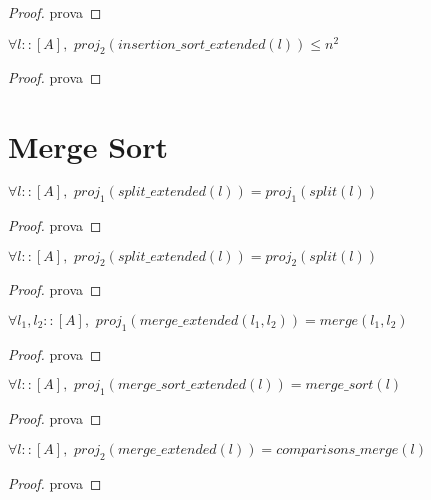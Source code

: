 \documentclass[12pt, oneside, a4paper,english,brazil]{abntex2}
\begin{document}
\begin{proof}
  prova
\end{proof}

\begin{teorema}
  $\forall l :: [A], \,\, proj_{2}(insertion\_sort\_extended(l)) \le n^{2}$
\end{teorema}

\begin{proof}
  prova
\end{proof}

\section{Merge Sort}

\begin{teorema}
  $\forall l :: [A], \,\, proj_1(split\_extended(l)) = proj_{1}(split(l))$
\end{teorema}

\begin{proof}
  prova
\end{proof}

\begin{teorema}
  $\forall l :: [A], \,\, proj_2(split\_extended(l)) = proj_{2}(split(l))$
\end{teorema}

\begin{proof}
  prova
\end{proof}

\begin{teorema}
  $\forall l_{1}, l_{2} :: [A], \,\, proj_1(merge\_extended(l_{1}, l_{2})) = merge(l_{1}, l_{2})$
\end{teorema}
\begin{proof}
  prova
\end{proof}

\begin{teorema}
  $\forall l :: [A], \,\, proj_{1}(merge\_sort\_extended(l)) = merge\_sort(l)$
\end{teorema}

\begin{proof}
  prova
\end{proof}

\begin{teorema}
  $\forall l :: [A], \,\, proj_{2}(merge\_extended(l)) = comparisons\_merge(l)$
\end{teorema}

\begin{proof}
  prova
\end{proof}
\end{document}
